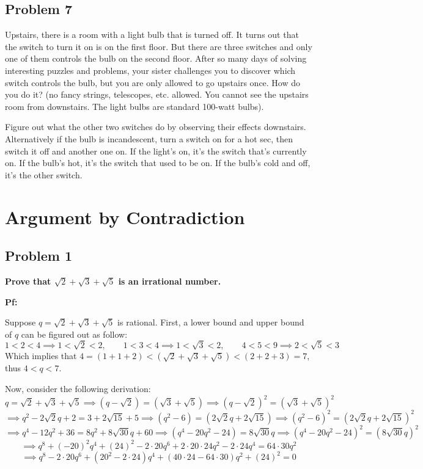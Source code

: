 \documentclass{article}
\begin{document}
\subsection{Problem 7}
Upstairs, there is a room with a light bulb that is turned off. It turns out that the switch to turn it on is on the first floor. But there are three switches and only one of them controls the bulb on the second floor. 
After so many days of solving interesting puzzles and problems, your sister challenges you to discover which switch controls the bulb, but you are only allowed to go upstairs once. 
How do you do it? (no fancy strings, telescopes, etc. allowed. You cannot see the upstairs room from downstairs. The light bulbs are standard 100-watt bulbs).

Figure out what the other two switches do by observing their effects downstairs. Alternatively if the bulb is incandescent, turn a switch on for a hot sec, then switch it off and another one on. If the light’s on, 
it's the switch that’s currently on. If the bulb’s hot, it's the switch that used to be on. If the bulb’s cold and off, it’s the other switch.


\hfill

\break

\section{Argument by Contradiction}
\subsection{Problem 1}

\textbf{Prove that $\sqrt{2}+\sqrt{3}+\sqrt{5}$ is an irrational number.}

\textbf{Pf:}

Suppose $q=\sqrt{2}+\sqrt{3}+\sqrt{5}$ is rational. First, a lower bound and upper bound of $q$ can be figured out as follow:
$$1 < 2 < 4 \implies 1 < \sqrt{2} < 2,\quad \quad 1 < 3 < 4 \implies 1 < \sqrt{3} < 2,\quad\quad 4 < 5 < 9 \implies 2<\sqrt{5}<3$$
Which implies that $4=(1+1+2) < (\sqrt{2}+\sqrt{3}+\sqrt{5})<(2+2+3)=7$, thus $4<q<7$.

\hfill

Now, consider the following derivation:
$$q=\sqrt{2}+\sqrt{3}+\sqrt{5} \implies (q-\sqrt{2})=(\sqrt{3}+\sqrt{5})\implies(q-\sqrt{2})^2=(\sqrt{3}+\sqrt{5})^2$$
$$\implies q^2-2\sqrt{2}q+2=3+2\sqrt{15}+5\implies (q^2-6)=(2\sqrt{2}q+2\sqrt{15})\implies (q^2-6)^2=(2\sqrt{2}q+2\sqrt{15})^2$$
$$\implies q^4-12q^2+36=8q^2+8\sqrt{30}q+60\implies (q^4-20q^2-24)=8\sqrt{30}q\implies (q^4-20q^2-24)^2=(8\sqrt{30}q)^2$$
$$\implies q^8+(-20)^2q^4+(24)^2 - 2\cdot 20q^6+2\cdot20\cdot24q^2-2\cdot24q^4=64\cdot30 q^2$$
$$\implies q^8-2\cdot 20q^6+(20^2-2\cdot24)q^4 + (40\cdot24-64\cdot30)q^2 + (24)^2=0$$
\end{document}
